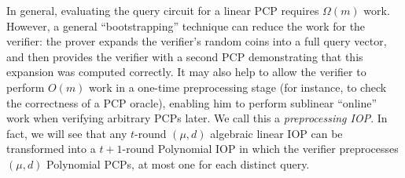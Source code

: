 In general, evaluating the query circuit for a linear PCP requires $\Omega(m)$ work. However, a general ``bootstrapping'' technique can reduce the work for the verifier: the prover expands the verifier's random coins into a full query vector, and then provides the verifier with a second PCP demonstrating that this expansion was computed correctly. It may also help to allow the verifier to perform $O(m)$ work in a one-time preprocessing stage (for instance, to check the correctness of a PCP oracle), enabling him to perform sublinear ``online'' work when verifying arbitrary PCPs later. We call this a \emph{preprocessing IOP}. In fact, we will see that any $t$-round $(\mu, d)$ algebraic linear IOP can be transformed into a $t+1$-round Polynomial IOP in which the verifier preprocesses $(\mu, d)$ Polynomial PCPs, at most one for each distinct query. 





